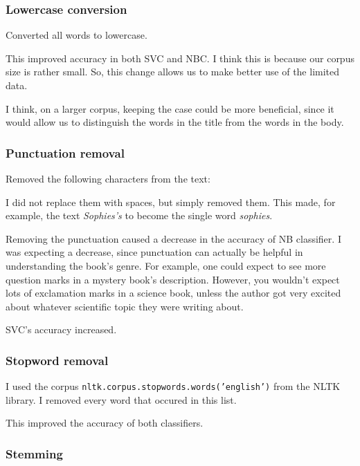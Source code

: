 \subsubsection{Lowercase conversion}
\label{sec:lowercase}

Converted all words to lowercase.

This improved accuracy in both SVC and NBC. I think this is because our corpus size is rather small. So, this change allows us to make better use of the limited data.

I think, on a larger corpus, keeping the case could be more beneficial, since it would allow us to distinguish the words in the title from the words in the body.

\subsubsection{Punctuation removal}
\label{sec:punctuation}

Removed the following characters from the text:


I did not replace them with spaces, but simply removed them. This made, for example, the text \emph{Sophies's} to become the single word \emph{sophies}.

Removing the punctuation caused a decrease in the accuracy of NB classifier. I was expecting a decrease, since punctuation can actually be helpful in understanding the book's genre. For example, one could expect to see more question marks in a mystery book's description. However, you wouldn't expect lots of exclamation marks in a science book, unless the author got very excited about whatever scientific topic they were writing about.

SVC's accuracy increased.

\subsubsection{Stopword removal}
\label{sec:stopwords}

I used the corpus \texttt{nltk.corpus.stopwords.words('english')} from the NLTK library. I removed every word that occured in this list.

This improved the accuracy of both classifiers.

\subsubsection{Stemming}
\label{sec:stemming}

